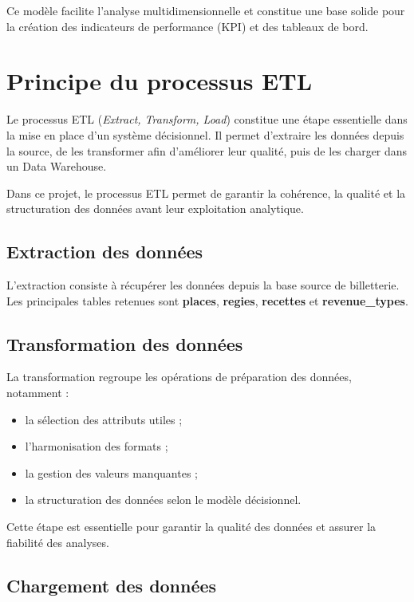 \documentclass[12pt,a4paper]{report}
\begin{document}
Ce modèle facilite l’analyse multidimensionnelle et constitue une base solide pour la création des indicateurs de performance (KPI) et des tableaux de bord.


\section{Principe du processus ETL}

Le processus ETL (\textit{Extract, Transform, Load}) constitue une étape essentielle dans la mise en place d’un système décisionnel. Il permet d’extraire les données depuis la source, de les transformer afin d’améliorer leur qualité, puis de les charger dans un Data Warehouse.

Dans ce projet, le processus ETL permet de garantir la cohérence, la qualité et la structuration des données avant leur exploitation analytique.

\subsection{Extraction des données}

L’extraction consiste à récupérer les données depuis la base source de billetterie. Les principales tables retenues sont \textbf{places}, \textbf{regies}, \textbf{recettes} et \textbf{revenue\_types}.

\subsection{Transformation des données}

La transformation regroupe les opérations de préparation des données, notamment :

\begin{itemize}
	\item la sélection des attributs utiles ;
	\item l’harmonisation des formats ;
	\item la gestion des valeurs manquantes ;
	\item la structuration des données selon le modèle décisionnel.
\end{itemize}

Cette étape est essentielle pour garantir la qualité des données et assurer la fiabilité des analyses.

\subsection{Chargement des données}
\end{document}
